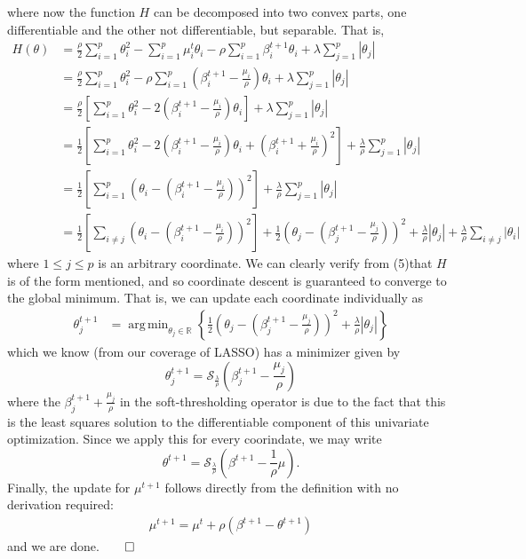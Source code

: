 \documentclass[10pt]{article}
\newcommand{\bp}[1]{\left({#1}\right)}
\newcommand{\mbb}[1]{\mathbb{#1}}
\newcommand{\1}[1]{\mathbbm{1}_{#1}}
\DeclareMathOperator{\argmin}{arg\,min}
\begin{document}
where now the function $H$ can be decomposed into two convex parts, one differentiable and the other not differentiable, but separable. That is,
\begin{align*}
    H(\theta)&=\frac{\rho}{2}\sum_{i=1}^p\theta_i^2-\sum_{i=1}^p\mu_i^t\theta_i-\rho\sum_{i=1}^p\beta^{t+1}_i\theta_i+\lambda\sum_{j=1}^p|\theta_j|\\
    &=\frac{\rho}{2}\sum_{i=1}^p\theta_i^2-\rho\sum_{i=1}^p\left(\beta_i^{t+1}-\frac{\mu_i}{\rho}\right)\theta_i+\lambda\sum_{j=1}^p|\theta_j|\\
    &=\frac{\rho}{2}\left[\sum_{i=1}^p\theta_i^2-2\bp{\beta_i^{t+1}-\frac{\mu_i}{\rho}}\theta_i\right]+\lambda\sum_{j=1}^p|\theta_j|\\
    &=\frac{1}{2}\left[\sum_{i=1}^p\theta_i^2-2\bp{\beta_i^{t+1}-\frac{\mu_i}{\rho}}\theta_i+\bp{\beta^{t+1}_i+\frac{\mu_i}{\rho}}^2\right]+\frac{\lambda}{\rho}\sum_{j=1}^p|\theta_j|\\
    &=\frac{1}{2}\left[\sum_{i=1}^p\bp{\theta_i-\bp{\beta_i^{t+1}-\frac{\mu_i}{\rho}}}^2\right]+\frac{\lambda}{\rho}\sum_{j=1}^p|\theta_j|\tag{5}\\
    &=\frac{1}{2}\left[\sum_{i\neq j}\bp{\theta_i-\bp{\beta_i^{t+1}-\frac{\mu_i}{\rho}}}^2\right]+\frac{1}{2}\bp{\theta_j-\bp{\beta_j^{t+1}-\frac{\mu_j}{\rho}}}^2+\frac{\lambda}{\rho}|\theta_j|+\frac{\lambda}{\rho}\sum_{i\neq j}|\theta_i|
\end{align*}
where $1\leq j\leq p$ is an arbitrary coordinate. We can clearly verify from (5)that $H$ is of the form mentioned, and so coordinate descent is guaranteed to converge to the global minimum. That is, we can update each coordinate individually as
\begin{align*}
    \theta^{t+1}_j&=\argmin_{\theta_j\in\mbb{R}}\left\{\frac{1}{2}\bp{\theta_j-\bp{\beta_j^{t+1}-\frac{\mu_j}{\rho}}}^2+\frac{\lambda}{\rho}|\theta_j|\right\}
\end{align*}
which we know (from our coverage of LASSO) has a minimizer given by
\[\theta^{t+1}_j=\mathcal{S}_{\frac{\lambda}{\rho}}\bp{\beta_j^{t+1}-\frac{\mu_j}{\rho}}\]
where the $\beta^{t+1}_j+\tfrac{\mu_j}{\rho}$ in the soft-thresholding operator is due to the fact that this is the least squares solution to the differentiable component of this univariate optimization. Since we apply this for every coorindate, we may write
\[\theta^{t+1}=\mathcal{S}_{\frac{\lambda}{\rho}}\bp{\beta^{t+1}-\frac{1}{\rho}\mu}.\]
Finally, the update for $\mu^{t+1}$ follows directly from the definition with no derivation required:
\begin{align*}
    \mu^{t+1}=\mu^t+\rho(\beta^{t+1}-\theta^{t+1})
\end{align*}
and we are done.\hfill{$\qed$}\\[5pt]
\end{document}

